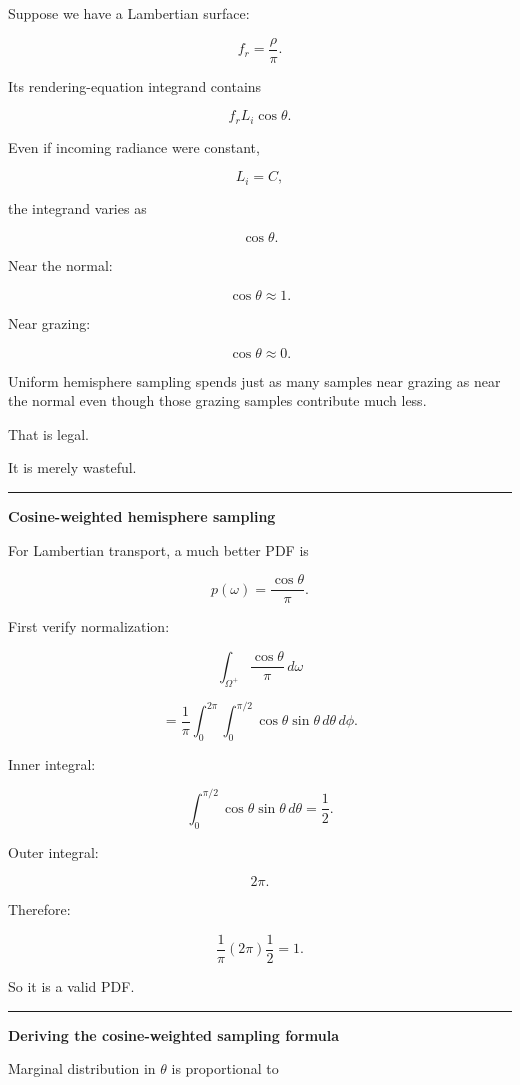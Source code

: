 Suppose we have a Lambertian surface:

\[
f_r=\frac{\rho}{\pi}.
\]

Its rendering-equation integrand contains

\[
f_rL_i\cos\theta.
\]

Even if incoming radiance were constant,

\[
L_i=C,
\]

the integrand varies as

\[
\cos\theta.
\]

Near the normal:

\[
\cos\theta\approx1.
\]

Near grazing:

\[
\cos\theta\approx0.
\]

Uniform hemisphere sampling spends just as many samples near grazing as near the normal even though those grazing samples contribute much less.

That is legal.

It is merely wasteful.

\begin{center}\rule{0.5\linewidth}{0.5pt}\end{center}

\textbf{Cosine-weighted hemisphere sampling}

For Lambertian transport, a much better PDF is

\[
\boxed{
p(\omega)
=
\frac{\cos\theta}{\pi}.
}
\]

First verify normalization:

\[
\int_{\Omega^+}
\frac{\cos\theta}{\pi}
\,d\omega
\]

\[
=
\frac1\pi
\int_0^{2\pi}
\int_0^{\pi/2}
\cos\theta
\sin\theta
\,d\theta\,d\phi.
\]

Inner integral:

\[
\int_0^{\pi/2}
\cos\theta\sin\theta\,d\theta
=
\frac12.
\]

Outer integral:

\[
2\pi.
\]

Therefore:

\[
\frac1\pi
(2\pi)
\frac12
=
1.
\]

So it is a valid PDF.

\begin{center}\rule{0.5\linewidth}{0.5pt}\end{center}

\textbf{Deriving the cosine-weighted sampling formula}

Marginal distribution in \(\theta\) is proportional to

